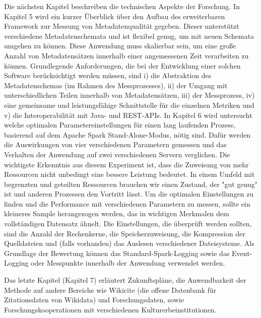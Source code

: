Die nächsten Kapitel beschreiben die technischen Aspekte der Forschung. In Kapitel 5 wird ein kurzer Überblick über den Aufbau des erweiterbaren Framework zur Messung von Metadatenqualität gegeben. Dieser unterstützt verschiedene Metadatenschemata und ist flexibel genug, um mit neuen Schemata umgehen zu können. Diese Anwendung muss skalierbar sein, um eine große Anzahl von Metadatensätzen innerhalb einer angemessenen Zeit verarbeiten zu können. Grundlegende Anforderungen, die bei der Entwicklung einer solchen Software berücksichtigt werden müssen, sind i) die Abstraktion des Metadatenschemas (im Rahmen des Messprozesses), ii) der Umgang mit unterschiedlichen Teilen innerhalb von Metadatensätzen, iii) der Messprozess, iv) eine gemeinsame und leistungsfähige Schnittstelle für die einzelnen Metriken und v) die Interoperabilität mit Java- und REST-APIs. In Kapitel 6 wird untersucht welche optimalen Parametereinstellungen für einen lang laufenden Prozess, basierend auf dem Apache Spark Stand-Alone-Modus, nötig sind. Dafür werden die Auswirkungen von vier verschiedenen Parametern gemessen und das Verhalten der Anwendung auf zwei verschiedenen Servern verglichen. Die wichtigste Erkenntnis aus diesem Experiment ist, dass die Zuweisung von mehr Ressourcen nicht unbedingt eine bessere Leistung bedeutet. In einem Umfeld mit begrenzten und geteilten Ressourcen brauchen wir einen Zustand, der "gut genug" ist und anderen Prozessen den Vortritt lässt. Um die optimalen Einstellungen zu finden und die Performance mit verschiedenen Parametern zu messen, sollte ein kleineres Sample herangezogen werden, das in wichtigen Merkmalen dem vollständigen Datensatz ähnelt. Die Einstellungen, die überprüft werden sollten, sind die Anzahl der Rechenkerne, die Speicherzuweisung, die Kompression der Quelldateien und (falls vorhanden) das Auslesen verschiedener Dateisysteme. Als Grundlage der Bewertung können das Standard-Spark-Logging sowie das Event-Logging oder Messpunkte innerhalb der Anwendung verwendet werden.

Das letzte Kapitel (Kapitel 7) erläutert Zukunftspläne, die Anwendbarkeit der Methode auf andere Bereiche wie Wikicite (die offene Datenbank für Zitationsdaten von Wikidata) und Forschungsdaten, sowie Forschungskooperationen mit verschiedenen Kulturerbeinstitutionen.